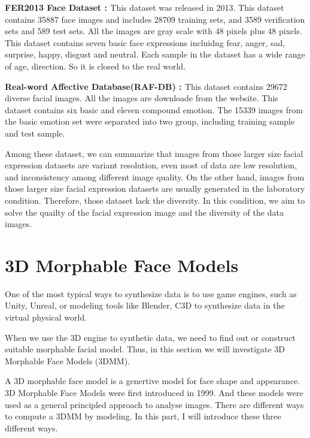 \textbf{FER2013 Face Dataset : \citep{carrier2013fer}} This dataset was released in 2013. This dataset contains 35887 face images and includes 28709 training sets, and 3589 verification sets and 589 test sets. All the images are gray scale with 48 pixels plus 48 pixels. This dataset contains seven basic face expressions incluidng fear, anger, sad, surprise, happy, disgust and neutral. Each sample in the dataset has a wide range of age, direction. So it is closed to the real world.

\textbf{ Real-word Affective Database(RAF-DB) : \citep{li2018reliable}} This dataset contains 29672 diverse facial images. All the images are downloade from the website. This dataset contains six basic and eleven compound emotion. The 15339 images from the basic emotion set were separated into two group, including training sample and test sample.


Among these dataset, we can summarize that images from those larger size facial expression datasets are variant resolution, even most of data are low resolution, and inconsistency among different image quality. On the other hand, images from those larger size facial expression datasets are usually generated in the laboratory condition. Therefore, those dataset lack the diversity. In this condition, we aim to solve the quailty of the facial expression image and the diversity of the data images.


\section{3D Morphable Face Models}
\label{sec:3dmm}
One of the most typical ways to synthesize data is to use game engines, such as Unity, Unreal, or modeling tools like Blender, C3D to synthesize data in the virtual physical world.

When we use the 3D engine to synthetic data, we need to find out or construct suitable morphable facial model. Thus, in this section we will investigate 3D Morphable Face Models (3DMM).

A 3D morphable face model is a genertive model for face shape and appearance. 3D Morphable Face Models were first introduced in 1999\citep{blanz1999morphable}. And these models were used as a general principled approach to analyse images. There are different ways to compute a 3DMM by modeling. In this part, I will introduce these three different ways.


